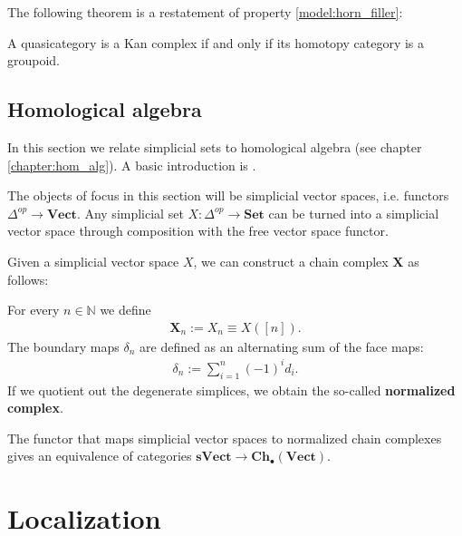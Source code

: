     The following theorem is a restatement of property \ref{model:horn_filler}:
    \begin{theorem}[Joyal]
        A quasicategory is a Kan complex if and only if its homotopy category is a groupoid.
    \end{theorem}

\subsection{Homological algebra}

    In this section we relate simplicial sets to homological algebra (see chapter \ref{chapter:hom_alg}). A basic introduction is \cite{master2020homology}.

    The objects of focus in this section will be simplicial vector spaces, i.e. functors $\Delta^{op}\rightarrow\mathbf{Vect}$. Any simplicial set $X:\Delta^{op}\rightarrow\mathbf{Set}$ can be turned into a simplicial vector space through composition with the free vector space functor.

    Given a simplicial vector space $X$, we can construct a chain complex $\mathbf{X}$ as follows:
    \begin{construct}
        For every $n\in\mathbb{N}$ we define
        \begin{gather}
            \mathbf{X}_n := X_n \equiv X([n]).
        \end{gather}
        The boundary maps $\delta_n$ are defined as an alternating sum of the face maps:
        \begin{gather}
            \delta_n := \sum_{i=1}^n(-1)^id_i.
        \end{gather}
        If we quotient out the degenerate simplices, we obtain the so-called \textbf{normalized complex}.
    \end{construct}
    \begin{theorem}\label{sheaf:dold_kan}
        The functor that maps simplicial vector spaces to normalized chain complexes gives an equivalence of categories $\mathbf{sVect}\rightarrow\mathbf{Ch}_\bullet(\mathbf{Vect})$.
    \end{theorem}

\section{Localization}

